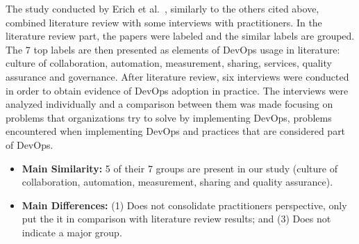 The study conducted by Erich et al.~\cite{qualitative_devops_journalsw_17},
similarly to the others cited above, combined literature review with some
interviews with practitioners. In the literature review part, the papers were
labeled and the similar labels are grouped. The 7 top labels are then presented
as elements of DevOps usage in literature: culture of collaboration, automation,
measurement, sharing, services, quality assurance and governance. After literature
review, six interviews were conducted in order to obtain evidence of DevOps
adoption in practice. The interviews were analyzed individually and a comparison
between them was made focusing on problems that organizations try to solve by
implementing DevOps, problems encountered when implementing DevOps and practices
that are considered part of DevOps.

\begin{itemize}
\item \textbf{Main Similarity:} 5 of their 7 groups are present in our study
(culture of collaboration, automation, measurement, sharing and quality assurance).
\item \textbf{Main Differences:} (1) Does not consolidate practitioners
perspective, only put the it in comparison with literature review results; and
(3) Does not indicate a major group.
\end{itemize}

